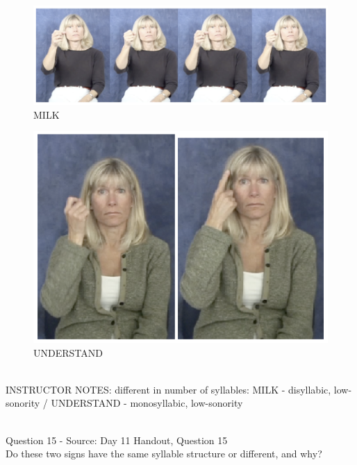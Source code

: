 \documentclass[12pt]{article}
\begin{document}
\begin{figure}[H]
\includegraphics{../images/asl_milk.png}
\caption{MILK}
\end{figure}
\begin{figure}[H]
\includegraphics{../images/asl_understand.png}
\caption{UNDERSTAND}
\end{figure}

~\\
INSTRUCTOR NOTES: different in number of syllables: MILK - disyllabic, low-sonority / UNDERSTAND - monosyllabic, low-sonority


~\\

{\large Question 15} - Source: Day 11 Handout, Question 15\\

Do these two signs have the same syllable structure or different, and why?\\
\end{document}
